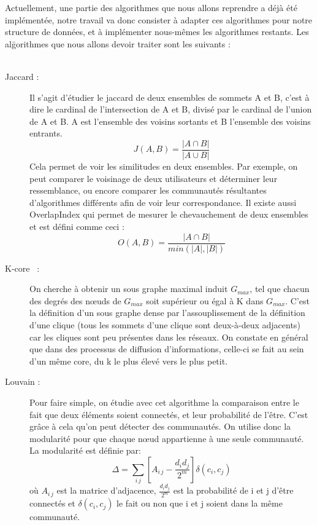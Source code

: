 \begin{titlepage}
\vspace{1cm}
{
Actuellement, une partie des algorithmes que nous allons reprendre a déjà été implémentée, notre travail va donc consister à adapter ces algorithmes pour notre structure de données, et à implémenter nous-mêmes les algorithmes restants. 
Les al\=gorithmes que nous allons devoir traiter sont les suivants : \\ \\
	
\begin{description}
\item[Jaccard :] Il s'agit d'étudier le jaccard \cite{jaccard} de deux ensembles de sommets A et B, c'est à dire le cardinal de l'intersection de A et B, divisé par le cardinal de l'union de A et B. A est l'ensemble des voisins sortants et B l'ensemble des voisins entrants. \[J(A,B) = \frac{|A \cap B|}{|A \cup B|}\] Cela permet de voir les similitudes en deux ensembles. Par exemple, on peut comparer le voisinage de deux utilisateurs et déterminer leur ressemblance, ou encore comparer les communautés résultantes d'algorithmes différents afin de voir  leur correspondance. Il existe aussi OverlapIndex qui permet de mesurer le chevauchement de deux ensembles et est défini comme ceci : \[O(A,B) = \frac{|A \cap B|}{min(|A|,|B|)}\]
\item[K-core~\cite{alvarezhamelin} :] On cherche à obtenir un sous graphe maximal induit $G_{max}$, tel que chacun des degrés des nœuds de $G_{max}$ soit supérieur ou égal à K dans $G_{max}$. C'est la définition d'un sous graphe dense par l'assouplissement de la définition d'une clique (tous les sommets d'une clique sont deux-à-deux adjacents) car les cliques sont peu présentes dans les réseaux. On constate en général que dans des processus de diffusion d'informations, celle-ci se fait au sein d'un même core, du k le plus élevé vers le plus petit.
\newline
\item[Louvain :] Pour faire simple, on étudie avec cet algorithme la comparaison entre le fait que deux éléments  soient connectés, et leur probabilité de l'être. C'est grâce à cela qu'on peut détecter des communautés. On utilise donc la modularité pour que chaque nœud appartienne à une seule communauté. La modularité est définie par: \[\Delta=\sum_{i\,j}\left[ A_{i\,j}-\frac{d_i d_j}{2^m}\right] \delta\left(c_i , c_j \right)\] où $A_{i\,j}$ est la matrice d'adjacence, $\frac{d_i d_j}{2^m}$ est la probabilité de i et j d'être connectés et $\delta(c_i , c_j)$ le fait ou non que i et j soient dans la même communauté.


\end{description}}
\end{titlepage}
